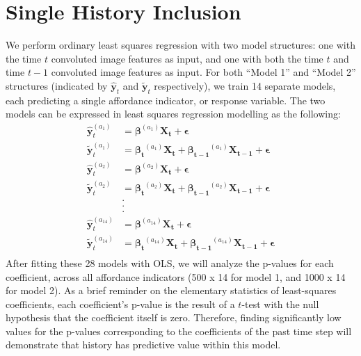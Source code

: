 \documentclass[11pt]{article}
\begin{document}
\section{Single History Inclusion}\label{sec:single_history}
We perform ordinary least squares regression with two model structures: one with the time $t$ convoluted image features as input, and one with both the time $t$ and time $t - 1$ convoluted image features as input.  For both ``Model 1'' and ``Model 2'' structures (indicated by $\hat{\mathbf{y}}_t$ and $\tilde{\mathbf{y}}_t$ respectively), we train 14 separate models, each predicting a single affordance indicator, or response variable.  The two models can be expressed in least squares regression modelling as the following:
\begin{align*}
\hat{\mathbf{y}}_t^{(a_1)} &= \bm{\beta}^{(a_1)}\mathbf{X_t} + \bm{\epsilon}\\
\tilde{\mathbf{y}}_t^{(a_1)} &= \bm{\beta_t}^{(a_1)}\mathbf{X_t} + \bm{\beta_{t-1}}^{(a_1)}\mathbf{X_{t-1}} + \bm{\epsilon}\\
\hat{\mathbf{y}}_t^{(a_2)} &= \bm{\beta}^{(a_2)}\mathbf{X_t} + \bm{\epsilon}\\
\tilde{\mathbf{y}}_t^{(a_2)} &= \bm{\beta_t}^{(a_2)}\mathbf{X_t} + \bm{\beta_{t-1}}^{(a_2)}\mathbf{X_{t-1}} + \bm{\epsilon}\\
&.\\&.\\&.\\
\hat{\mathbf{y}}_t^{(a_{14})} &= \bm{\beta}^{(a_{14})}\mathbf{X_t} + \bm{\epsilon}\\
\tilde{\mathbf{y}}_t^{(a_{14})} &= \bm{\beta_t}^{(a_{14})}\mathbf{X_t} + \bm{\beta_{t-1}}^{(a_{14})}\mathbf{X_{t-1}} + \bm{\epsilon}\\
\end{align*}
After fitting these 28 models with OLS, we will analyze the p-values for each coefficient, across all affordance indicators (500 x 14 for model 1, and 1000 x 14 for model 2).  As a brief reminder on the elementary statistics of least-squares coefficients, each coefficient's p-value is the result of a $t$-test with the null hypothesis that the coefficient itself is zero.  Therefore, finding significantly low values for the p-values corresponding to the coefficients of the past time step will demonstrate that history has predictive value within this model.
\end{document}
